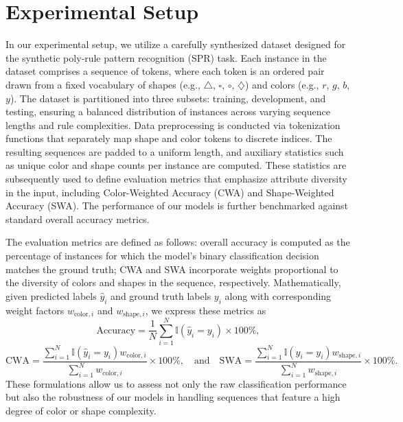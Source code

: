 \documentclass[11pt]{article}
\begin{document}
\section{Experimental Setup}
In our experimental setup, we utilize a carefully synthesized dataset designed for the synthetic poly‐rule pattern recognition (SPR) task. Each instance in the dataset comprises a sequence of tokens, where each token is an ordered pair drawn from a fixed vocabulary of shapes (e.g., \(\triangle\), \(\square\), \(\circ\), \(\diamondsuit\)) and colors (e.g., \(r\), \(g\), \(b\), \(y\)). The dataset is partitioned into three subsets: training, development, and testing, ensuring a balanced distribution of instances across varying sequence lengths and rule complexities. Data preprocessing is conducted via tokenization functions that separately map shape and color tokens to discrete indices. The resulting sequences are padded to a uniform length, and auxiliary statistics such as unique color and shape counts per instance are computed. These statistics are subsequently used to define evaluation metrics that emphasize attribute diversity in the input, including Color-Weighted Accuracy (CWA) and Shape-Weighted Accuracy (SWA). The performance of our models is further benchmarked against standard overall accuracy metrics.

The evaluation metrics are defined as follows: overall accuracy is computed as the percentage of instances for which the model's binary classification decision matches the ground truth; CWA and SWA incorporate weights proportional to the diversity of colors and shapes in the sequence, respectively. Mathematically, given predicted labels \( \hat{y}_i \) and ground truth labels \( y_i \) along with corresponding weight factors \( w_{\text{color}, i} \) and \( w_{\text{shape}, i} \), we express these metrics as
\[
\text{Accuracy} = \frac{1}{N}\sum_{i=1}^{N} \mathbb{I}\left(\hat{y}_i = y_i\right) \times 100\%,
\]
\[
\text{CWA} = \frac{\sum_{i=1}^{N} \mathbb{I}\left(\hat{y}_i = y_i\right) w_{\text{color}, i}}{\sum_{i=1}^{N} w_{\text{color}, i}} \times 100\%, \quad \text{and} \quad
\text{SWA} = \frac{\sum_{i=1}^{N} \mathbb{I}\left(\hat{y}_i = y_i\right) w_{\text{shape}, i}}{\sum_{i=1}^{N} w_{\text{shape}, i}} \times 100\%.
\]
These formulations allow us to assess not only the raw classification performance but also the robustness of our models in handling sequences that feature a high degree of color or shape complexity.
\end{document}
